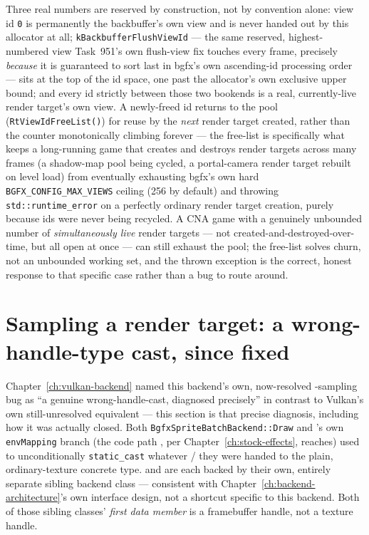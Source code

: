 Three real numbers are reserved by construction, not by convention alone: view id \texttt{0} is
permanently the backbuffer's own view and is never handed out by this allocator at all;
\texttt{kBackbufferFlushViewId} --- the same reserved, highest-numbered view Task~951's own
flush-view fix touches every frame, precisely \emph{because} it is guaranteed to sort last in
bgfx's own ascending-id processing order --- sits at the top of the id space, one past the
allocator's own exclusive upper bound; and every id strictly between those two bookends is a
real, currently-live render target's own view. A newly-freed id returns to the pool
(\texttt{RtViewIdFreeList()}) for reuse by the \emph{next} render target created, rather than
the counter monotonically climbing forever --- the free-list is specifically what keeps a
long-running game that creates and destroys render targets across many frames (a shadow-map
pool being cycled, a portal-camera render target rebuilt on level load) from eventually
exhausting bgfx's own hard \texttt{BGFX\_CONFIG\_MAX\_VIEWS} ceiling (256 by default) and
throwing \texttt{std::runtime\_error} on a perfectly ordinary render target creation, purely
because ids were never being recycled. A CNA game with a genuinely unbounded number of
\emph{simultaneously live} render targets --- not created-and-destroyed-over-time, but all
open at once --- can still exhaust the pool; the free-list solves churn, not an unbounded
working set, and the thrown exception is the correct, honest response to that specific case
rather than a bug to route around.

\section{Sampling a render target: a wrong-handle-type cast, since fixed}
\label{sec:bgfx-wrong-handle-cast}

Chapter~\ref{ch:vulkan-backend} named this backend's own, now-resolved
-sampling bug as ``a genuine wrong-handle-cast, diagnosed precisely''
in contrast to Vulkan's own still-unresolved equivalent --- this section is that precise
diagnosis, including how it was actually closed. Both \texttt{BgfxSpriteBatchBackend::Draw} and
's own \texttt{envMapping} branch (the code path
, per Chapter~\ref{ch:stock-effects}, reaches) used to
unconditionally \texttt{static\_cast} whatever  /  they were handed to the plain, ordinary-texture concrete type.
 and  are each backed by their own,
entirely separate sibling backend class --- consistent with
Chapter~\ref{ch:backend-architecture}'s own  interface design,
not a shortcut specific to this backend. Both of those sibling classes'
\emph{first data member} is a framebuffer handle, not a texture handle.

